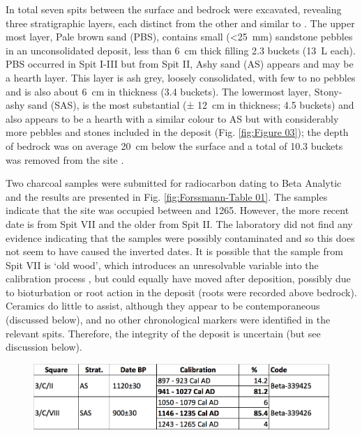 In total seven spits between the surface and bedrock were excavated, revealing three stratigraphic layers, each distinct from the other and similar to \textcite['s]{Walker_1994}. 
The upper most layer, Pale brown sand (PBS), contains small (<\SI{25}{\milli\meter}) sandstone pebbles in an unconsolidated deposit,
 less than \SI{6}{\centi\meter} thick filling 2.3 buckets (\SI{13}{\liter} each). 
PBS occurred in Spit I-III but from Spit II, Ashy sand (AS) appears and may be a hearth layer. This layer is ash grey, loosely consolidated, with few to no pebbles and is also about \SI{6}{\centi\meter} in thickness (3.4 buckets). 
The lowermost layer, Stony-ashy sand (SAS), is the most substantial (± \SI{12}{\centi\meter} in thickness; 4.5 buckets) and also appears to be a hearth with a similar colour to AS but with considerably more pebbles and stones included in the deposit (Fig. \ref{fig:Figure 03}); the depth of bedrock was on average \SI{20}{\centi\meter} below the surface and a total of 10.3 buckets was removed from the site \parencite[for more details see][95]{Forssman_2014a}. 

Two charcoal samples were submitted for radiocarbon dating to Beta Analytic and the results are presented in Fig. \ref{fig:Forssmann-Table 01}. The samples indicate that the site was occupied between  and 1265. However, the more recent date is from Spit VII and the older from Spit II. The laboratory did not find any evidence indicating that the samples were possibly contaminated and so this does not seem to have caused the inverted dates. It is possible that the sample from Spit VII is ‘old wood’, which introduces an unresolvable variable into the calibration process \parencite{Kennett_2002}, but could equally have moved after deposition, possibly due to bioturbation \parencite[see][]{Lancaster_2003} or root action in the deposit (roots were recorded above bedrock). Ceramics do little to assist, although they appear to be contemporaneous (discussed below), and no other chronological markers were identified in the relevant spits. Therefore, the integrity of the deposit is uncertain (but see discussion below).

	\begin{figure} %
		\includegraphics[width=\linewidth]{figures/Forssman-Table01}
		\label{fig:Forssmann-Table01}
	\end{figure}

